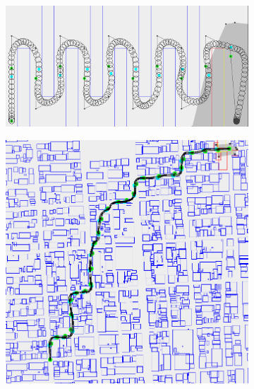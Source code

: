 \begin{figure}
	\centering
	
	\begin{subfigure}[t]{0.74\textwidth}
        		\includegraphics[width=\textwidth]{img/benchmarkfull}
        		\caption{}
	\end{subfigure}
		
	\begin{subfigure}[t]{0.70\textwidth}
        		\includegraphics[width=\textwidth]{img/SF}
        		\caption{}
	\end{subfigure}	
	

\end{figure}
